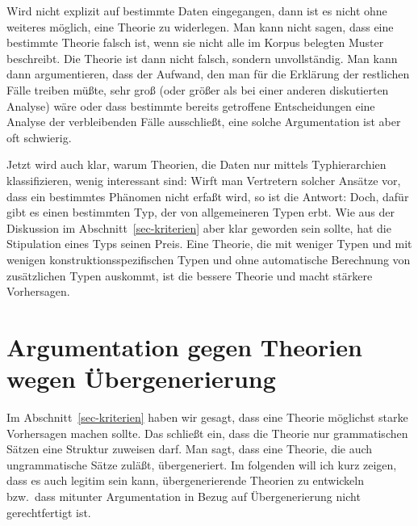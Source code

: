 Wird nicht explizit auf bestimmte Daten eingegangen, dann ist es nicht ohne weiteres möglich,
eine Theorie zu widerlegen. Man kann \zb nicht sagen, dass eine bestimmte Theorie %
falsch ist, wenn sie nicht alle im Korpus belegten Muster %
beschreibt. Die Theorie ist dann nicht falsch, sondern unvollständig. Man kann dann argumentieren,
dass der Aufwand, den man für die Erklärung der restlichen Fälle treiben müßte, sehr groß (oder größer als bei einer
anderen diskutierten Analyse) wäre oder dass bestimmte bereits getroffene Entscheidungen eine Analyse der verbleibenden Fälle ausschließt,
eine solche Argumentation ist aber oft schwierig. 

Jetzt wird auch klar, warum Theorien, die Daten nur mittels Typhierarchien klassifizieren,
wenig interessant sind: Wirft man Vertretern solcher Ansätze vor, dass ein bestimmtes Phänomen
nicht erfaßt wird, so ist die Antwort: Doch, dafür gibt es einen bestimmten Typ, der von allgemeineren
Typen erbt. Wie aus der Diskussion im Abschnitt~\ref{sec-kriterien} aber klar geworden sein sollte,
hat die Stipulation eines Typs seinen Preis. Eine Theorie, die mit weniger Typen und mit wenigen
konstruktionsspezifischen Typen und ohne automatische Berechnung von zusätzlichen Typen
auskommt, ist die bessere Theorie und macht stärkere Vorhersagen.






\section{Argumentation gegen Theorien wegen Übergenerierung}

Im Abschnitt~\ref{sec-kriterien} haben wir gesagt, dass eine Theorie möglichst starke Vorhersagen
machen sollte. Das schließt ein, dass die Theorie nur grammatischen Sätzen eine Struktur zuweisen
darf. Man sagt, dass eine Theorie, die auch ungrammatische Sätze zuläßt, übergeneriert. Im folgenden
will ich kurz zeigen, dass es auch legitim sein kann, übergenerierende Theorien zu entwickeln bzw.\
dass mitunter Argumentation in Bezug auf Übergenerierung nicht gerechtfertigt ist.

